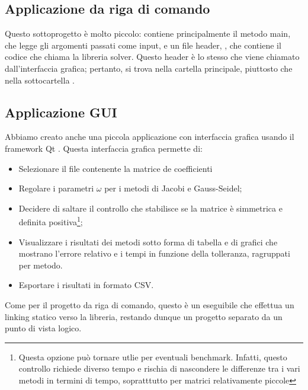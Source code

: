 \subsection{Applicazione da riga di comando}
Questo sottoprogetto è molto piccolo: contiene principalmente il metodo main, che legge gli argomenti passati come input, e un file header, , che contiene il codice che chiama la libreria solver. Questo header è lo stesso che viene chiamato dall'interfaccia grafica; pertanto, si trova nella cartella principale, piuttosto che nella sottocartella .


\subsection{Applicazione GUI}
Abbiamo creato anche una piccola applicazione con interfaccia grafica usando il framework Qt \cite{Qt}. Questa interfaccia grafica permette di:
\begin{itemize}
	\item Selezionare il file contenente la matrice de coefficienti
	\item Regolare i parametri $\omega$ per i metodi di Jacobi e Gauss-Seidel;
	\item Decidere di saltare il controllo che stabilisce se la matrice è simmetrica e definita positiva\footnote{Questa opzione può tornare utlie per eventuali benchmark. Infatti, questo controllo richiede diverso tempo e rischia di nascondere le differenze tra i vari metodi in termini di tempo, sopratttutto per matrici relativamente piccole};
	\item Visualizzare i risultati dei metodi sotto forma di tabella e di grafici che mostrano l'errore relativo e i tempi in funzione della tolleranza, ragruppati per metodo.
	\item Esportare i risultati in formato CSV.
\end{itemize}

Come per il progetto da riga di comando, questo è un eseguibile che effettua un linking statico verso la libreria, restando dunque un progetto separato da un punto di vista logico.